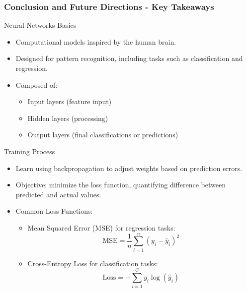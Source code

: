 \documentclass[aspectratio=169]{beamer}
\begin{document}
\begin{frame}[fragile]
  \frametitle{Conclusion and Future Directions - Key Takeaways}
  
  \begin{block}{Neural Networks Basics}
    \begin{itemize}
      \item Computational models inspired by the human brain.
      \item Designed for pattern recognition, including tasks such as classification and regression.
      \item Composed of:
      \begin{itemize}
        \item Input layers (feature input)
        \item Hidden layers (processing)
        \item Output layers (final classifications or predictions)
      \end{itemize}
    \end{itemize}
  \end{block}
  
  \begin{block}{Training Process}
    \begin{itemize}
      \item Learn using backpropagation to adjust weights based on prediction errors.
      \item Objective: minimize the loss function, quantifying difference between predicted and actual values.
      \item Common Loss Functions:
      \begin{itemize}
        \item Mean Squared Error (MSE) for regression tasks:
          \begin{equation}
          \text{MSE} = \frac{1}{n} \sum_{i=1}^n (y_i - \hat{y}_i)^2
          \end{equation}
        \item Cross-Entropy Loss for classification tasks:
          \begin{equation}
          \text{Loss} = -\sum_{i=1}^{C} y_i \log(\hat{y}_i)
          \end{equation}
      \end{itemize}
    \end{itemize}
  \end{block}

\end{frame}
\end{document}
